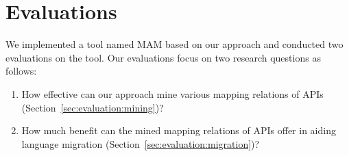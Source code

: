 \section{Evaluations}
\label{sec:evaluation} We implemented a tool named MAM based on our
approach and conducted two evaluations on the tool. Our evaluations
focus on two research questions as follows:
\vspace*{-1.5ex}\begin{enumerate}
\item How effective can our approach mine various mapping relations of APIs
(Section~\ref{sec:evaluation:mining})? \vspace*{-1.5ex}
\item How much benefit can the mined mapping relations of APIs offer in aiding language
migration (Section~\ref{sec:evaluation:migration})?\vspace*{-1.5ex}
\end{enumerate}%
